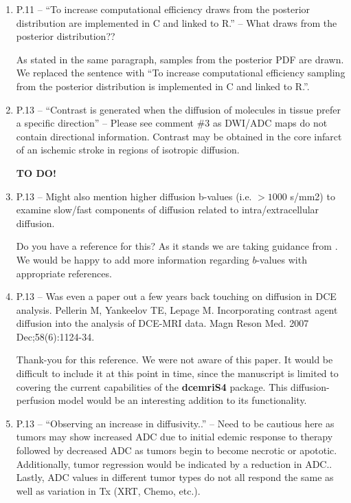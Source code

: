 \documentclass[11pt]{article}
\begin{document}
\begin{enumerate}
\item P.11 – ``To increase computational efficiency draws from the
  posterior distribution are implemented in C and linked to R.'' –
  What draws from the posterior distribution??

  As stated in the same paragraph, samples from the posterior PDF are
  drawn.  We replaced the sentence with ``To increase computational
  efficiency sampling from the posterior distribution is implemented
  in \textsf{C} and linked to \textsf{R}.''.

\item P.13 – ``Contrast is generated when the diffusion of molecules
  in tissue prefer a specific direction'' – Please see comment \#3 as
  DWI/ADC maps do not contain directional information.  Contrast may
  be obtained in the core infarct of an ischemic stroke in regions of
  isotropic diffusion.

  \textbf{TO DO!}  

\item P.13 – Might also mention higher diffusion b-values
  (i.e. $>1000$ s/mm2) to examine slow/fast components of diffusion
  related to intra/extracellular diffusion.

  Do you have a reference for this?  As it stands we are taking
  guidance from \citet{pad-etal:neoplasia}.  We would be happy to add
  more information regarding $b$-values with appropriate references.

\item P.13 – Was even a paper out a few years back touching on
  diffusion in DCE analysis.  Pellerin M, Yankeelov TE, Lepage
  M. Incorporating contrast agent diffusion into the analysis of
  DCE-MRI data. Magn Reson Med. 2007 Dec;58(6):1124-34.

  Thank-you for this reference.  We were not aware of this paper.  It
  would be difficult to include it at this point in time, since the
  manuscript is limited to covering the current capabilities of the
  \textbf{dcemriS4} package.  This diffusion-perfusion model would be
  an interesting addition to its functionality.

\item P.13 – ``Observing an increase in diffusivity..'' – Need to be
  cautious here as tumors may show increased ADC due to initial edemic
  response to therapy followed by decreased ADC as tumors begin to
  become necrotic or apototic. Additionally, tumor regression would be
  indicated by a reduction in ADC.. Lastly, ADC values in different
  tumor types do not all respond the same as well as variation in Tx
  (XRT, Chemo, etc.).


\end{enumerate}
\end{document}

